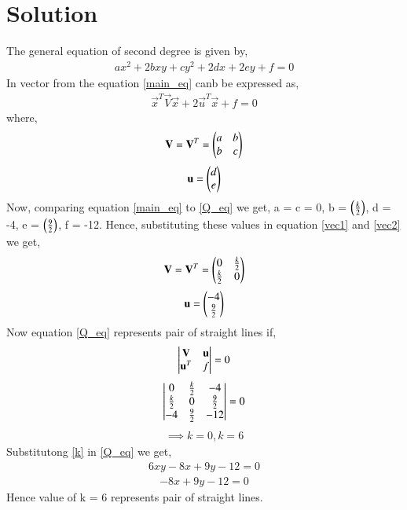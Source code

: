 \documentclass[journal,12pt,twocolumn]{IEEEtran}
\begin{document}
\section{Solution}
The general equation of second degree is given by,
\begin{align}
ax^2 + 2bxy + cy^2 + 2dx +2ey +f = 0
\label{main_eq}
\end{align}
In vector from the equation \eqref{main_eq} canb be expressed as,
\begin{align}
\vec{x}^T\vec{V}\vec{x} + 2\vec{u}^T\vec{x} + f = 0 
\label{line_vec}
\end{align}
where,
\begin{align}
\mathbf{V} = \mathbf{V}^T = \begin{pmatrix}a&b\\b&c\end{pmatrix}
\label{vec1}
\end{align}
\begin{align}
\mathbf{u} = \begin{pmatrix}d\\e\end{pmatrix}
\label{vec2}
\end{align}
Now, comparing equation \eqref{main_eq} to \eqref{Q_eq} we get, a = c = 0, b = $\left(\frac{k}{2}\right)$, d = -4, e = $\left(\frac{9}{2}\right)$, f = -12.  
Hence, substituting these values in equation \eqref{vec1} and \eqref{vec2} we get,
\begin{align}
\mathbf{V} = \mathbf{V}^T = \begin{pmatrix}0&\frac{k}{2}\\\frac{k}{2}&0\end{pmatrix}
\end{align}
\begin{align}
\mathbf{u} = \begin{pmatrix}-4\\\frac{9}{2}\end{pmatrix}
\end{align}
Now equation \eqref{Q_eq} represents pair of straight lines if,
\begin{align}
\begin{vmatrix}\mathbf{V}&\mathbf{u}\\\mathbf{u}^T&f\end{vmatrix} = 0
\end{align}
\begin{align}
\begin{vmatrix}0&\frac{k}{2}&-4\\\frac{k}{2}&0&\frac{9}{2}\\-4&\frac{9}{2}&-12\end{vmatrix} = 0
\end{align}
\begin{align}
\implies k =0 , k = 6 
\label{k}
\end{align}
Substitutong \eqref{k} in \eqref{Q_eq} we get,
\begin{align}
6xy-8x+9y-12 = 0
\end{align}
\begin{align}
-8x+9y-12 = 0
\end{align}
Hence value of k = 6 represents pair of straight lines.
\end{document}
